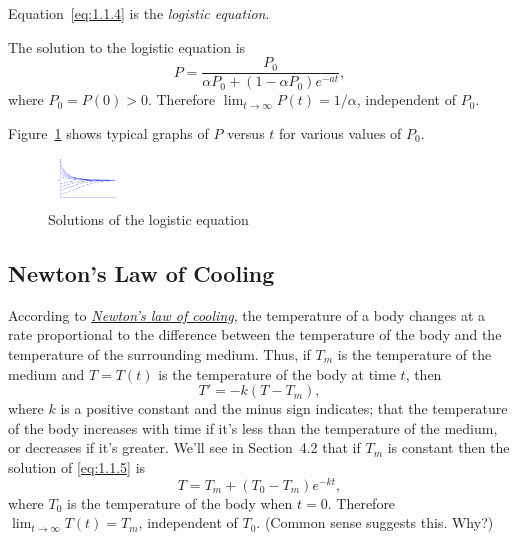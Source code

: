 \documentclass{ximera}
\begin{document}
Equation~\eqref{eq:1.1.4} is  the \textit{logistic equation}. 


The solution to the logistic equation is
$$
P=\frac{P_0}{\alpha P_0+(1-\alpha P_0)e^{-at}},
$$
where $P_0=P(0)>0$. Therefore
$\lim_{t\to\infty}P(t)=1/\alpha$, independent of $P_0$.

Figure~\ref{figure:1.1.1} shows typical graphs of $P$ versus $t$ for
various values of  $P_0$.


\begin{center}
\begin{figure}
  \includegraphics[height=0.5in]{fig010101.jpg}
  \caption{ Solutions of the logistic equation}
  \label{figure:1.1.1}
\end{figure}
\end{center}


\subsection*{Newton's Law of Cooling}

According to
\href{http://www-history.mcs.st-and.ac.uk/Mathematicians/Newton.html}
{\textit{Newton's law of cooling}},  the temperature of a
body changes at a rate proportional to the difference between the
temperature of the body and the temperature of the surrounding medium.
 Thus, if  $T_m$ is the temperature of the
medium and
$T=T(t)$ is the temperature of the body at time $t$, then
\begin{equation} \label{eq:1.1.5}
T' = -k(T-T_m),
\end{equation}
where $k$ is a positive constant and the  minus sign indicates;   that
the temperature of the body increases with time if it's less than the
temperature of the medium, or decreases if it's  greater. We'll see
in Section~4.2 that if
$T_m$ is constant then the solution of \eqref{eq:1.1.5} is
\begin{equation} \label{eq:1.1.6}
T=T_m+(T_0-T_m)e^{-kt},
\end{equation}
where $T_0$ is the temperature of the body when $t=0$.
Therefore $\lim_{t\to\infty}T(t)=T_m$, independent of $T_0$.
(Common sense suggests this. Why?)
\end{document}
